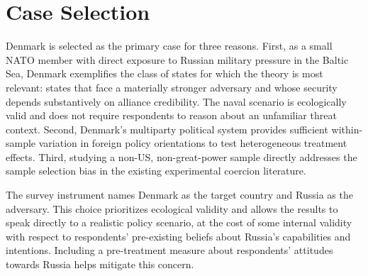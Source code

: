 \section{Case Selection}

Denmark is selected as the primary case for three reasons. First, as a small NATO member with direct exposure to Russian military pressure in the Baltic Sea, Denmark exemplifies the class of states for which the theory is most relevant: states that face a materially stronger adversary and whose security depends substantively on alliance credibility. The naval scenario is ecologically valid and does not require respondents to reason about an unfamiliar threat context. Second, Denmark's multiparty political system provides sufficient within-sample variation in foreign policy orientations to test heterogeneous treatment effects. Third, studying a non-US, non-great-power sample directly addresses the sample selection bias in the existing experimental coercion literature.

The survey instrument names Denmark as the target country and Russia as the adversary. This choice prioritizes ecological validity and allows the results to speak directly to a realistic policy scenario, at the cost of some internal validity with respect to respondents' pre-existing beliefs about Russia's capabilities and intentions. Including a pre-treatment measure about respondents' attitudes towards Russia helps mitigate this concern.

\printbibliography


